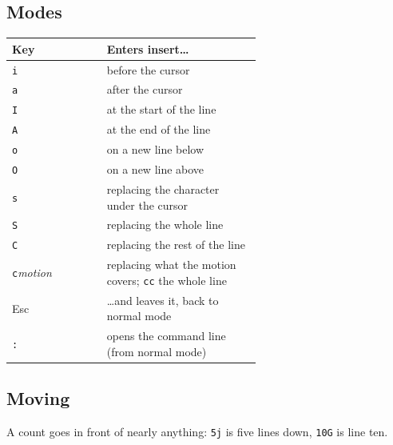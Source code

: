 \subsection*{Modes}
\begin{center}
\small
\begin{tabular}{@{}l >{\raggedright\arraybackslash}p{0.62\linewidth}@{}}
\toprule
\textbf{Key} & \textbf{Enters insert\ldots} \\
\midrule
\texttt{i} & before the cursor \\
\texttt{a} & after the cursor \\
\texttt{I} & at the start of the line \\
\texttt{A} & at the end of the line \\
\texttt{o} & on a new line below \\
\texttt{O} & on a new line above \\
\texttt{s} & replacing the character under the cursor \\
\texttt{S} & replacing the whole line \\
\texttt{C} & replacing the rest of the line \\
\texttt{c}\emph{motion} & replacing what the motion covers; \texttt{cc} the whole line \\
\midrule
Esc & \ldots and leaves it, back to normal mode \\
\texttt{:} & opens the command line (from normal mode) \\
\bottomrule
\end{tabular}
\end{center}

\subsection*{Moving}
A count goes in front of nearly anything: \verb|5j| is five lines down,
\verb|10G| is line ten.

